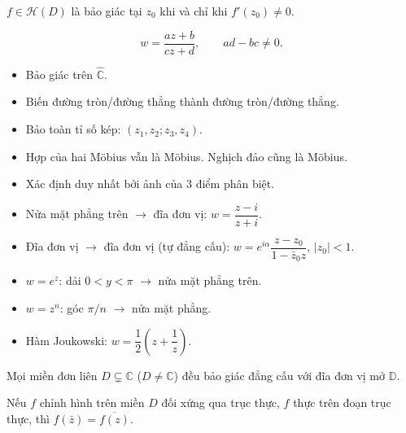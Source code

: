 \documentclass[12pt,a4paper]{article}
\begin{document}
\begin{dinhly}
  $f \in \mathcal{H}(D)$ là bảo giác tại $z_0$ khi và chỉ khi $f'(z_0) \ne 0$.
\end{dinhly}

\begin{dinhnghia}[title={Phép biến đổi Möbius (phân tuyến tính)}]
  \[
    w = \frac{az + b}{cz + d}, \qquad ad - bc \ne 0.
  \]
\end{dinhnghia}

\begin{tinhchat}[title={Tính chất Möbius}]
  \begin{itemize}
    \item Bảo giác trên $\hat{\mathbb{C}}$.
    \item Biến đường tròn/đường thẳng thành đường tròn/đường thẳng.
    \item Bảo toàn tỉ số kép: $(z_1, z_2; z_3, z_4)$.
    \item Hợp của hai Möbius vẫn là Möbius. Nghịch đảo cũng là Möbius.
    \item Xác định duy nhất bởi ảnh của 3 điểm phân biệt.
  \end{itemize}
\end{tinhchat}

\begin{congthuc}[title={Các ánh xạ bảo giác quan trọng}]
  \begin{itemize}
    \item Nửa mặt phẳng trên $\to$ đĩa đơn vị: $w = \dfrac{z - i}{z + i}$.
    \item Đĩa đơn vị $\to$ đĩa đơn vị (tự đẳng cấu): $w = e^{i\alpha}\dfrac{z - z_0}{1 - \bar{z}_0 z}$, $|z_0| < 1$.
    \item $w = e^z$: dải $0 < y < \pi$ $\to$ nửa mặt phẳng trên.
    \item $w = z^n$: góc $\pi/n$ $\to$ nửa mặt phẳng.
    \item Hàm Joukowski: $w = \dfrac{1}{2}\left(z + \dfrac{1}{z}\right)$.
  \end{itemize}
\end{congthuc}

\begin{dinhly}[title={Định lý ánh xạ Riemann}]
  Mọi miền đơn liên $D \subsetneq \mathbb{C}$ ($D \ne \mathbb{C}$) đều bảo giác đẳng cấu với đĩa đơn vị mở $\mathbb{D}$.
\end{dinhly}

\begin{dinhly}[title={Nguyên lý đối xứng Schwarz}]
  Nếu $f$ chỉnh hình trên miền $D$ đối xứng qua trục thực, $f$ thực trên đoạn trục thực, thì $f(\bar{z}) = \overline{f(z)}$.
\end{dinhly}
\end{document}
